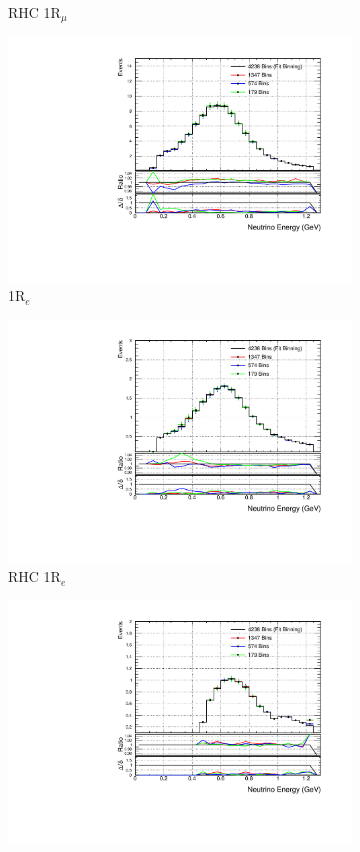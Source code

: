 \begin{figure}
\begin{subfigure}{.49\textwidth}
  \caption{RHC 1R$_{\mu}$}
\end{subfigure}
\begin{subfigure}{.49\textwidth}
  \centering
  \includegraphics[width=0.95\linewidth]{figs/detbin_nue}
  \caption{1R$_{e}$}
\end{subfigure}
\begin{subfigure}{.49\textwidth}
  \centering
  \includegraphics[width=0.95\linewidth]{figs/detbin_nuebar}
  \caption{RHC 1R$_{e}$}
\end{subfigure}
\begin{subfigure}{.49\textwidth}
  \centering
  \includegraphics[width=0.95\linewidth]{figs/detbin_nue1pi}

\end{subfigure}
\end{figure}
